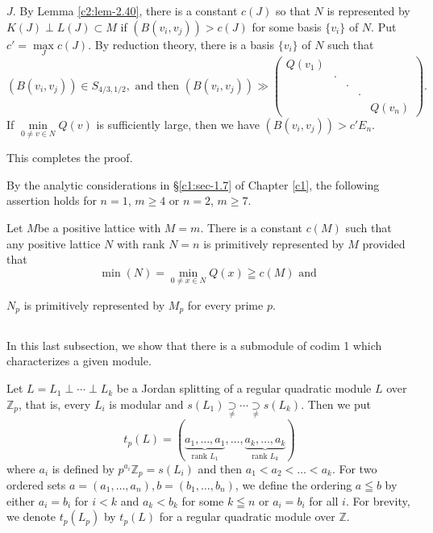 \begin{proofofthm}
$J$. By Lemma \ref{c2:lem-2.40}, there is a constant $c(J)$ so that $N$ is
represented by $K(J)\perp L(J)\subset M$ if $(B(v_i, v_j))>c(J)$ for
some basis $\{v_i\}$ of $N$. Put $c'=\max\limits_J c(J)$. By reduction
theory, there is a basis $\{v_i\}$ of $N$ such that 
$$
(B(v_i, v_j)) \in S_{4/3, 1/2}, \text{ and then } (B(v_i,
v_j)) \gg \left(\begin{smallmatrix}
Q(v_1) & & & & \\
& \cdot & & & \\
& & \cdot & & \\
& & & \cdot & \\
& & & & Q(v_n)
\end{smallmatrix} \right).
$$ 
If $\min\limits_{0\neq v \in N} Q (v)$ is sufficiently large,
then we have $(B(v_i, v_j)) > c'E_n$. 

This completes the proof.
\end{proofofthm}

\begin{remark*}
By the analytic considerations in \S \ref{c1:sec-1.7} of Chapter
\ref{c1}, the following 
assertion holds for $n=1$, $m\geq 4$ or $n=2$, $m\geq 7$.

Let $M$\pageoriginale be a positive lattice with $M=m$. There is a
constant $c(M)$ 
such that any positive lattice $N$ with rank $N=n$ is primitively
represented by $M$ provided that 
$$
\min(N) = \min_{0\neq x\in N} Q(x) \geqq c (M) \text{ and }
$$

$N_p$ is primitively represented by $M_p$ for every prime $p$.
\end{remark*}

\subsection{}\label{c2:subsec2.4.5}
 In this last subsection, we show that
there is a submodule of codim 1 which characterizes a given module.

Let $L=L_1\perp \cdots \perp L_k$ be a Jordan splitting of a regular
quadratic module $L$ over $\mathbb{Z}_p$, that is, every $L_i$ is
modular and
$s(L_1) \mathop{\supset}\limits_{\neq} \cdots \mathop{\supset}\limits_{\neq}
s(L_k)$. Then we put 
$$
t_p (L) = (\underbrace{a_1,\ldots,a_1}_{\text{rank }
L_1},\ldots, \underbrace{a_k,\ldots, a_k}_{\text{rank } L_k})
$$
where $a_i$ is defined by $p^{a_i} \mathbb{Z}_p =s(L_i)$ and then $a_1
<a_2 <\ldots <a_k$. For two ordered sets $a=(a_1,\ldots, a_n),
b=(b_1,\ldots, b_n)$, we define the ordering $a\leqq b$ by either $a_i
=b_i$ for $i<k$ and $a_k < b_k$ for some $k\leqq n$ or $a_i = b_i$ for
all $i$. For brevity, we denote $t_p(L_p)$ by $t_p(L)$ for a regular
quadratic module over $\mathbb{Z}$.

